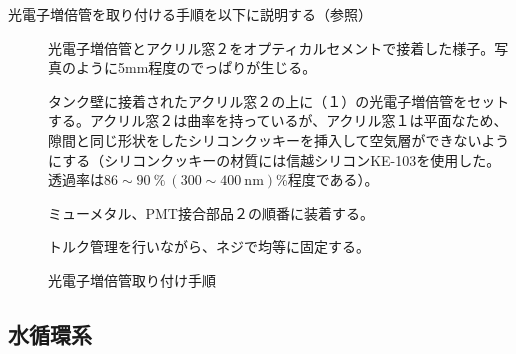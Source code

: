 光電子増倍管を取り付ける手順を以下に説明する（参照）
\begin{description}
\item[] 光電子増倍管とアクリル窓２をオプティカルセメントで接着した様子。写真のように5mm程度のでっぱりが生じる。
\item[] タンク壁に接着されたアクリル窓２の上に（１）の光電子増倍管をセットする。アクリル窓２は曲率を持っているが、アクリル窓１は平面なため、隙間と同じ形状をしたシリコンクッキーを挿入して空気層ができないようにする（シリコンクッキーの材質には信越シリコンKE-103を使用した。透過率は$86\sim90\ \%\ (300\sim400\ \mathrm{nm})$\%程度である）。
\item[] ミューメタル、PMT接合部品２の順番に装着する。
\item[] トルク管理を行いながら、ネジで均等に固定する。
\end{description}

\begin{figure}[htbp]
  \begin{minipage}{0.47\textwidth}
  \end{minipage}
  \hfill
  \begin{minipage}{0.47\textwidth}
  \end{minipage}
  \hfill
  \begin{minipage}{0.47\textwidth}
  \end{minipage}
  \hfill
  \begin{minipage}{0.47\textwidth}
  \end{minipage}
    \caption{光電子増倍管取り付け手順}
  \label{PMTAssyProcedure}
\end{figure}


\subsection{水循環系}

